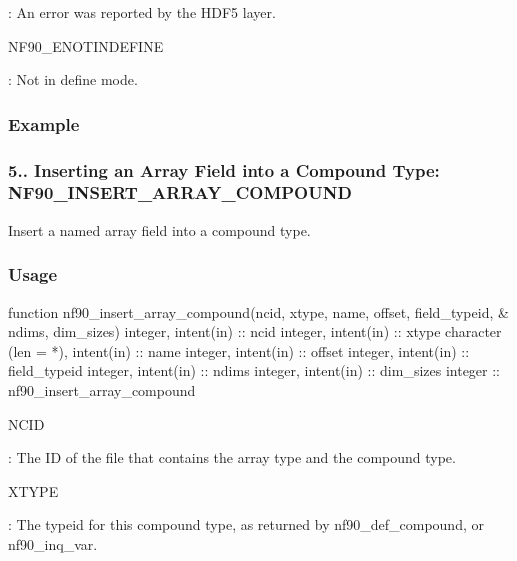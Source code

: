 \+: An error was reported by the H\+D\+F5 layer.

{\ttfamily N\+F90\+\_\+\+E\+N\+O\+T\+I\+N\+D\+E\+F\+I\+NE}

\+: Not in define mode.

\subsubsection*{Example}\hypertarget{f90-user-defined-data-types_f90-inserting-an-array-field-into-a-compound-type-nf90_insert_array_compound}{}\subsubsection{5.. Inserting an Array Field into a Compound Type\+: N\+F90\+\_\+\+I\+N\+S\+E\+R\+T\+\_\+\+A\+R\+R\+A\+Y\+\_\+\+C\+O\+M\+P\+O\+U\+ND}\label{f90-user-defined-data-types_f90-inserting-an-array-field-into-a-compound-type-nf90_insert_array_compound}
Insert a named array field into a compound type.

\subsubsection*{Usage}


\begin{DoxyCode}
\textcolor{keyword}{function }nf90\_insert\_array\_compound(ncid, xtype, name, offset, field\_typeid, &
     ndims, dim\_sizes)
  \textcolor{keywordtype}{integer}, \textcolor{keywordtype}{intent(in)} :: ncid
  \textcolor{keywordtype}{integer}, \textcolor{keywordtype}{intent(in)} :: xtype
  \textcolor{keywordtype}{character (len = *)}, \textcolor{keywordtype}{intent(in)} :: name
  \textcolor{keywordtype}{integer}, \textcolor{keywordtype}{intent(in)} :: offset
  \textcolor{keywordtype}{integer}, \textcolor{keywordtype}{intent(in)} :: field\_typeid
  \textcolor{keywordtype}{integer}, \textcolor{keywordtype}{intent(in)} :: ndims
  \textcolor{keywordtype}{integer}, \textcolor{keywordtype}{intent(in)} :: dim\_sizes
  \textcolor{keywordtype}{integer} :: nf90\_insert\_array\_compound
\end{DoxyCode}


{\ttfamily N\+C\+ID}

\+: The ID of the file that contains the array type and the compound type.

{\ttfamily X\+T\+Y\+PE}

\+: The typeid for this compound type, as returned by nf90\+\_\+def\+\_\+compound, or nf90\+\_\+inq\+\_\+var.

